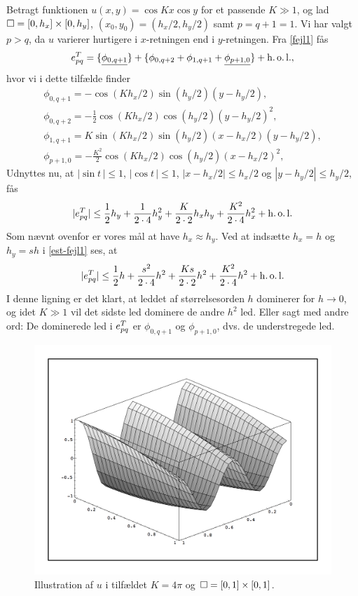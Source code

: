 \begin{example}
Betragt funktionen $u(x,y)=\cos Kx \cos y$ for et passende $K\gg 1$,
og lad $\Box=[0,h_x]\times [0,h_y]$, $(x_0,y_0)=(h_x/2,h_y/2)$ samt
$p=q+1=1$. Vi har valgt $p>q$, da $u$ varierer hurtigere i
$x$-retningen end i $y$-retningen.  Fra \eqref{fejl1} fås
\begin{equation}
  e_{pq}^T = \{ \underline{\phi_{0,q+1}} \} + \{ \phi_{0,q+2} +
  \phi_{1,q+1} + \underline{\phi_{p+1,0}} \} + \operatorname{h.o.l.},
\end{equation}
hvor vi i dette tilfælde finder
\begin{gather}
  \phi_{0,q+1} = -\cos (Kh_x/2) \sin (h_y/2) (y-h_y/2), \\
  \phi_{0,q+2} = -\frac{1}{2} \cos (Kh_x/2) \cos (h_y/2) (y-h_y/2)^2, \\
  \phi_{1,q+1} = K \sin (Kh_x/2) \sin (h_y/2) (x-h_x/2)(y-h_y/2), \\
  \phi_{p+1,0} = -\frac{K^2}{2}\cos (Kh_x/2) \cos (h_y/2) (x-h_x/2)^2,
\end{gather}
Udnyttes nu, at $|\sin t\, |\leq 1$, $|\cos t\, |\leq 1$,
$|x-h_x/2|\leq h_x/2$ og $|y-h_y/2|\leq h_y/2$, fås
\begin{equation} \label{est-fejl1}
  |e_{pq}^T| \leq \frac{1}{2}h_y + \frac{1}{2\cdot 4}h_y^2 +
  \frac{K}{2\cdot 2}h_xh_y + \frac{K^2}{2\cdot 4}h_x^2 + \operatorname{h.o.l.}
\end{equation}
Som nævnt ovenfor er vores mål at have $h_x \approx h_y$. Ved
at indsætte $h_x =h$ og $h_y =sh$ i \eqref{est-fejl1} ses, at
\begin{equation}
  |e_{pq}^T| \leq \frac{1}{2}h + \frac{s^2}{2\cdot 4}h^2 +
  \frac{Ks}{2\cdot 2}h^2 + \frac{K^2}{2\cdot 4}h^2 + \operatorname{h.o.l.}
\end{equation}
I denne ligning er det klart, at leddet af størrelsesorden $h$
dominerer for $h\rightarrow 0$, og idet $K\gg 1$ vil det sidste led
dominere de andre $h^2$ led. Eller sagt med andre ord: De dominerede
led i $e_{pq}^T$ er $\phi_{0,q+1}$ og $\phi_{p+1,0}$, dvs. de
understregede led.
\begin{figure}
\includegraphics{cos}
\caption{Illustration af $u$ i tilfældet $K = 4\pi$ og
$\Box=[0,1]\times [0,1]$.}
\end{figure}
\end{example}
